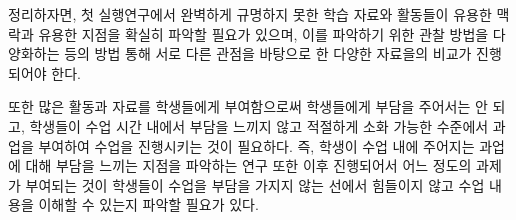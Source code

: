 \documentclass[10pt, a4paper, chapter]{oblivoir}
\begin{document}
    \noindent
    정리하자면, 첫 실행연구에서 완벽하게 규명하지 못한 학습 자료와 활동들이 유용한 맥락과 
    유용한 지점을 확실히 파악할 필요가 있으며, 이를 파악하기 위한 관찰 방법을 다양화하는 등의 방법 통해 서로 다른 관점을 바탕으로 한 다양한 자료을의 비교가 진행되어야 한다. 

    또한 많은 활동과 자료를 학생들에게 부여함으로써 학생들에게 부담을 주어서는 안 되고, 학생들이 수업 시간 내에서 부담을 느끼지 않고 적절하게 소화 가능한 수준에서 
    과업을 부여하여 수업을 진행시키는 것이 필요하다. 즉, 학생이 수업 내에 주어지는 과업에 대해 
    부담을 느끼는 지점을 파악하는 연구 또한 이후 진행되어서 어느 정도의 과제가 부여되는 것이 학생들이 수업을 부담을 가지지 않는 선에서 힘들이지 않고 수업 내용을 이해할 수 있는지 파악할 필요가 있다.

    \printbibliography[title = {References}]
\end{document}
